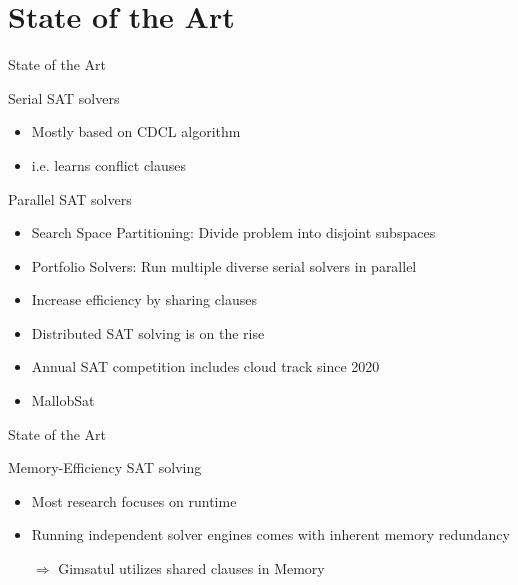 \documentclass{beamer}
\begin{document}
\section{State of the Art}
\begin{frame}{State of the Art}
    \begin{block}{Serial SAT solvers}
        \begin{itemize}
            \item Mostly based on CDCL algorithm
            \item i.e. learns conflict clauses
        \end{itemize}
    \end{block}

    \begin{block}{Parallel SAT solvers}
        \begin{itemize}
            \item Search Space Partitioning: Divide problem into disjoint subspaces
            \item Portfolio Solvers: Run multiple diverse serial solvers in parallel
            \item Increase efficiency by sharing clauses
            \item Distributed SAT solving is on the rise
            \item Annual SAT competition includes cloud track since 2020
            \item MallobSat
        \end{itemize}
    \end{block}
\end{frame}

\begin{frame}{State of the Art}
    \begin{block}{Memory-Efficiency SAT solving}
        \begin{itemize}
            \item Most research focuses on runtime
            \item Running independent solver engines comes with inherent memory redundancy
            \item[$\Rightarrow$] Gimsatul utilizes shared clauses in Memory
        \end{itemize}
    \end{block}
\end{frame}
\end{document}
